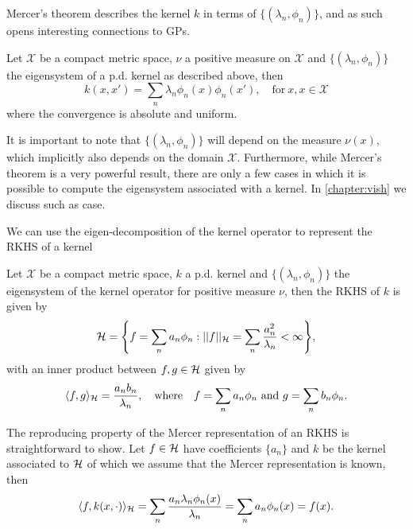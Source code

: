Mercer's theorem describes the kernel $k$ in terms of $\{(\lambda_n, \phi_n)\}$, and as such opens interesting connections to GPs.
\begin{theorem}[Mercer]
  Let $\mathcal{X}$ be a compact metric space, $\nu$ a positive measure on $\mathcal{X}$ and $\{(\lambda_n, \phi_n)\}$ the eigensystem of a p.d. kernel as described above, then
\begin{equation}
  \label{eq:mercer}
  k(x,x')  = \sum_n \lambda_n \phi_n(x) \phi_n(x'),\quad\text{for}\ x,x\in \mathcal{X}
\end{equation}
where the convergence is absolute and uniform.
\end{theorem}
It is important to note that $\{(\lambda_n, \phi_n)\}$ will depend on the measure $\nu(x)$, which implicitly also depends on the domain $\mathcal{X}$. Furthermore, while Mercer's theorem is a very powerful result, there are only a few cases in which it is possible to compute the eigensystem associated with a kernel. In \cref{chapter:vish} we discuss such as case.

We can use the eigen-decomposition of the kernel operator to represent the RKHS of a kernel
\begin{theorem}
  Let $\mathcal{X}$ be a compact metric space, $k$ a p.d. kernel and $\{(\lambda_n, \phi_n)\}$ the eigensystem of the kernel operator for positive measure $\nu$, then the RKHS of $k$ is given by
\begin{equation}
    \label{eq:mercer-rkhs}
    \rkhs = \left\{
    f = \sum_n a_n \phi_{n}:
    \norm{f}_{\rkhs} = \sum_n \frac{a_n^2}{\lambda_n} < \infty
    \right\},
\end{equation}
with an inner product between $f,g \in {\mathcal{H}}$ given by
\begin{equation}
  \langle f, g \rangle_{\rkhs} = \frac{a_n b_n}{\lambda_n},\quad\text{where}\quad f = \sum_n a_n \phi_n\ \text{and}\ g = \sum_n b_n \phi_n.
\end{equation}
\end{theorem}
The reproducing property of the Mercer representation of an RKHS is straightforward to show. Let $f \in {\mathcal{H}}$ have coefficients $\{a_n\}$ and $k$ be the kernel associated to ${\mathcal{H}}$ of which we assume that the Mercer representation is known, then
\begin{equation}
  \langle f, k(x, \cdot) \rangle_{{\mathcal{H}}} = \sum_n \frac{a_n \lambda_n \phi_n(x)}{\lambda_n} = \sum_n a_n \phi_n(x) = f(x).
\end{equation}

